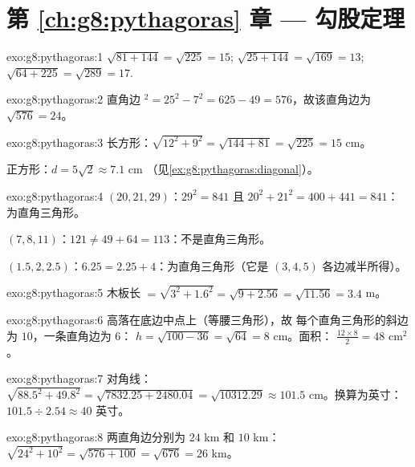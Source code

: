\section*{第 \ref{ch:g8:pythagoras} 章 --- 勾股定理}

\begin{solution}{exo:g8:pythagoras:1}
$\sqrt{81 + 144} = \sqrt{225} = 15$; \quad
$\sqrt{25 + 144} = \sqrt{169} = 13$; \quad
$\sqrt{64 + 225} = \sqrt{289} = 17$.
\end{solution}

\begin{solution}{exo:g8:pythagoras:2}
直角边 $^2 = 25^2 - 7^2 = 625 - 49 = 576$，故该直角边为
$\sqrt{576} = 24$。
\end{solution}

\begin{solution}{exo:g8:pythagoras:3}
长方形：$\sqrt{12^2 + 9^2} = \sqrt{144 + 81} = \sqrt{225} = 15$
cm。

正方形：$d = 5\sqrt2 \approx 7.1$ cm
（见\cref{ex:g8:pythagoras:diagonal}）。
\end{solution}

\begin{solution}{exo:g8:pythagoras:4}
$(20, 21, 29)$：$29^2 = 841$ 且 $20^2 + 21^2 = 400 + 441 = 841$：
为直角三角形。

$(7, 8, 11)$：$121 \neq 49 + 64 = 113$：不是直角三角形。

$(1.5, 2, 2.5)$：$6.25 = 2.25 + 4$：为直角三角形（它是
$(3,4,5)$ 各边减半所得）。
\end{solution}

\begin{solution}{exo:g8:pythagoras:5}
木板长 $= \sqrt{3^2 + 1.6^2} = \sqrt{9 + 2.56} = \sqrt{11.56} = 3.4$
m。
\end{solution}

\begin{solution}{exo:g8:pythagoras:6}
高落在底边中点上（等腰三角形），故
每个直角三角形的斜边为 $10$，一条直角边为 $6$：
$h = \sqrt{100 - 36} = \sqrt{64} = 8$ cm。面积：
$\frac{12 \times 8}{2} = 48$ cm$^2$。
\end{solution}

\begin{solution}{exo:g8:pythagoras:7}
对角线：$\sqrt{88.5^2 + 49.8^2} = \sqrt{7832.25 + 2480.04}
= \sqrt{10312.29} \approx 101.5$ cm。换算为英寸：
$101.5 \div 2.54 \approx 40$ 英寸。
\end{solution}

\begin{solution}{exo:g8:pythagoras:8}
两直角边分别为 $24$ km 和 $10$ km：
$\sqrt{24^2 + 10^2} = \sqrt{576 + 100} = \sqrt{676} = 26$ km。
\end{solution}

